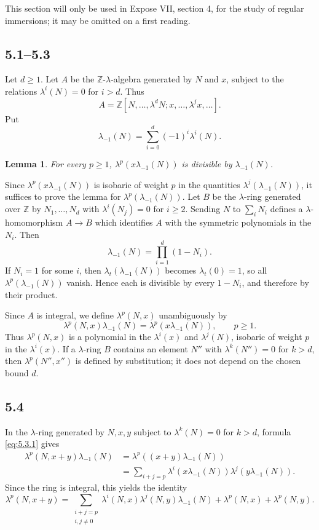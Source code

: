 \documentclass[11pt]{article}
\theoremstyle{plain}
\newtheorem{lemma}[theorem]{Lemma}
\theoremstyle{definition}
\theoremstyle{remark}
\newcommand{\ZZ}{\mathbb Z}
\begin{document}
This section will only be used in Expose VII, section 4, for the study of regular immersions; it may be omitted on a first reading.

\subsection*{5.1--5.3}
Let $d\geq 1$. Let $A$ be the $\ZZ$-$\lambda$-algebra generated by $N$ and $x$, subject to the relations $\lambda^i(N)=0$ for $i>d$. Thus
\[
A=\ZZ[N,\ldots,\lambda^dN;x,\ldots,\lambda^jx,\ldots].
\]
Put
\[
\lambda_{-1}(N)=\sum_{i=0}^{d}(-1)^i\lambda^i(N).
\]

\begin{lemma}
For every $p\geq 1$, $\lambda^p(x\lambda_{-1}(N))$ is divisible by $\lambda_{-1}(N)$.
\end{lemma}

Since $\lambda^p(x\lambda_{-1}(N))$ is isobaric of weight $p$ in the quantities $\lambda^j(\lambda_{-1}(N))$, it suffices to prove the lemma for $\lambda^p(\lambda_{-1}(N))$. Let $B$ be the $\lambda$-ring generated over $\ZZ$ by $N_1,\ldots,N_d$ with $\lambda^i(N_j)=0$ for $i\geq 2$. Sending $N$ to $\sum_iN_i$ defines a $\lambda$-homomorphism $A\to B$ which identifies $A$ with the symmetric polynomials in the $N_i$. Then
\[
\lambda_{-1}(N)=\prod_{i=1}^{d}(1-N_i).
\]
If $N_i=1$ for some $i$, then $\lambda_t(\lambda_{-1}(N))$ becomes $\lambda_t(0)=1$, so all $\lambda^p(\lambda_{-1}(N))$ vanish. Hence each is divisible by every $1-N_i$, and therefore by their product.

Since $A$ is integral, we define $\lambda^p(N,x)$ unambiguously by
\begin{equation}\label{eq:5.3.1}
\lambda^p(N,x)\lambda_{-1}(N)=\lambda^p(x\lambda_{-1}(N)),
\qquad p\geq 1.
\end{equation}
Thus $\lambda^p(N,x)$ is a polynomial in the $\lambda^i(x)$ and $\lambda^j(N)$, isobaric of weight $p$ in the $\lambda^i(x)$. If a $\lambda$-ring $B$ contains an element $N''$ with $\lambda^k(N'')=0$ for $k>d$, then $\lambda^p(N'',x'')$ is defined by substitution; it does not depend on the chosen bound $d$.

\subsection*{5.4}
In the $\lambda$-ring generated by $N,x,y$ subject to $\lambda^k(N)=0$ for $k>d$, formula \eqref{eq:5.3.1} gives
\begin{align*}
\lambda^p(N,x+y)\lambda_{-1}(N)
&=\lambda^p((x+y)\lambda_{-1}(N))\\
&=\sum_{i+j=p}\lambda^i(x\lambda_{-1}(N))\lambda^j(y\lambda_{-1}(N)).
\end{align*}
Since the ring is integral, this yields the identity
\begin{equation}\label{eq:5.4.1}
\lambda^p(N,x+y)=\sum_{\substack{i+j=p\\ i,j\neq 0}}\lambda^i(N,x)\lambda^j(N,y)\lambda_{-1}(N)+\lambda^p(N,x)+\lambda^p(N,y).
\end{equation}
\end{document}
